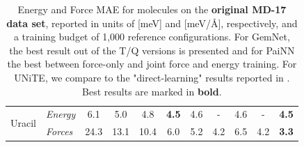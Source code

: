\documentclass[11pt]{article}
\begin{document}
\begin{table}[!htbp]
{\begin{tabular}{llccccccccc}
\multirow{2}{*}{Uracil}  & \textit{Energy} & 6.1 & 5.0 &4.8 &\textbf{ 4.5} & 4.6& - & 4.6&  - & \textbf{4.5} \\ 
                          & \textit{Forces} & 24.3& 13.1 &10.4 & 6.0 &5.2 & 4.2 & 6.5 & 4.2 & \textbf{3.3}\\ \hline
  \hline \hline
    \end{tabular}}
    \caption{Energy and Force MAE for molecules on the \textbf{original MD-17 data set}, reported in units of [meV] and [meV/{\AA}], respectively, and a training budget of 1,000 reference configurations. For GemNet, the best result out of the T/Q versions is presented and for PaiNN the best between force-only and joint force and energy training. For UNiTE, we compare to the "direct-learning" results reported in \cite{qiao2021unite}. Best results are marked in \textbf{bold}.}
    \label{tab:md17}
\end{table}
\end{document}
